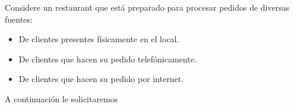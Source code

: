 \documentclass[11pt,letterpaper]{article}
\begin{document}
\begin{spacing}{1.2}
\thispagestyle{empty}
\evaluationTitle

\newcommand{\separatorLine}{\begin{center}\rule{.6\textwidth}{1pt}\end{center}}

\begin{Problem}

     Considere un restaurant que está preparado para procesar
    pedidos de diversas fuentes:
    \begin{itemize}[itemsep=0pt]
        \item De clientes presentes físicamente en el local.
        \item De clientes que hacen su pedido telefónicamente.
        \item De clientes que hacen su pedido por internet.
    \end{itemize}

    A continuación le solicitaremos 
\begin{ProbPart}


\end{ProbPart}

\end{Problem}

\end{spacing}
\end{document}
